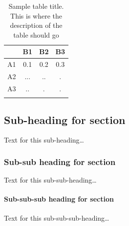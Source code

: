 \documentclass{bmcart}
\begin{document}
		
		\begin{table}[h!]
			\caption{Sample table title. This is where the description of the table should go}
			\begin{tabular}{cccc}
				\hline
				& B1  &B2   & B3\\ 
				\hline
				A1 & 0.1 & 0.2 & 0.3\\
				A2 & ... & ..  & .\\
				A3 & ..  & .   & .\\ 
				\hline
				\label{tab:ejemplo}
			\end{tabular}
		\end{table}
				
		\subsection*{Sub-heading for section}
			Text for this sub-heading\ldots
	
			\subsubsection*{Sub-sub heading for section}
				Text for this sub-sub-heading\ldots
					
					\paragraph*{Sub-sub-sub heading for section}
						Text for this sub-sub-sub-heading\ldots
	
\end{document}
